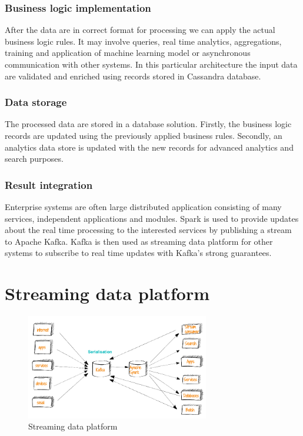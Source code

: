 \documentclass[a4paper, 10 pt, conference]{IEEEtran}
\begin{document}
\subsubsection{Business logic implementation}
After the data are in correct format for processing we can apply the actual business logic rules. It may involve queries, real time analytics, aggregations, training and application of machine learning model or asynchronous communication with other systems. In this particular architecture the input data are validated and enriched using records stored in Cassandra database.

\subsubsection{Data storage}
The processed data are stored in a database solution. Firstly, the business logic records are updated using the previously applied business rules. Secondly, an analytics data store is updated with the new records for advanced analytics and search purposes. 

\subsubsection{Result integration}
Enterprise systems are often large distributed application consisting of many services, independent applications and modules. Spark is used to provide updates about the real time processing to the interested services by publishing a stream to Apache Kafka. Kafka is then used as streaming data platform for other systems to subscribe to real time updates with Kafka's strong guarantees.

\section{Streaming data platform}

\begin{figure}[hb]
	\begin{center}
		\caption{Streaming data platform}
		\label{fig:streamingDataPlatform}
		\includegraphics[width=8cm,keepaspectratio]{streaming-data-platform.png}
	\end{center}
\end{figure}
\end{document}

